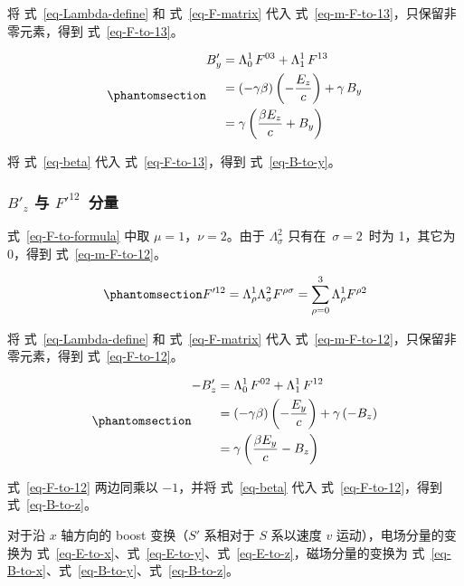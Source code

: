 \documentclass[
  chinese,
  a4paper,
  UTF8,
  12pt,
  oneside,
  openany]{ctexbook}
\theoremstyle{plain}
\theoremstyle{plain}
\theoremstyle{plain}
\theoremstyle{definition}
\theoremstyle{plain}
\theoremstyle{plain}
\theoremstyle{remark}
\begin{document}
将 式~\ref{eq-Lambda-define} 和 式~\ref{eq-F-matrix} 代入
式~\ref{eq-m-F-to-13}，只保留非零元素，得到 式~\ref{eq-F-to-13}。

\begin{equation}\protect\phantomsection\label{eq-F-to-13}{
\begin{aligned}
B'_y
&= \Lambda_{0}^{1}\,F^{03} + \Lambda_{1}^{1}\,F^{13} \\
&= (-\gamma\beta)\left(-\frac{E_z}{c}\right) + \gamma\, B_y \\
&= \gamma\left(\frac{\beta E_z}{c} + B_y \right)
\end{aligned}
}\end{equation}

将 式~\ref{eq-beta} 代入 式~\ref{eq-F-to-13}，得到 式~\ref{eq-B-to-y}。

\subsubsection{\texorpdfstring{\(B'_z\) 与
\(F'^{12}\)~分量}{B\textquotesingle\_z 与 F\textquotesingle\^{}\{12\}~分量}}\label{b_z-ux4e0e-f12-ux5206ux91cf}

式~\ref{eq-F-to-formula} 中取 \(\mu = 1\)，\(\nu = 2\)。由于
\(\Lambda_{\sigma}^{2}\) 只有在~\(\sigma = 2\)~时为 1，其它为 0，得到
式~\ref{eq-m-F-to-12}。

\begin{equation}\protect\phantomsection\label{eq-m-F-to-12}{
F'^{12} = \Lambda_{\rho}^{1}\Lambda_{\sigma}^{2}F^{\rho\sigma}
= \sum_{\rho = 0}^{3}\Lambda_{\rho}^{1}F^{\rho 2}
}\end{equation}

将 式~\ref{eq-Lambda-define} 和 式~\ref{eq-F-matrix} 代入
式~\ref{eq-m-F-to-12}，只保留非零元素，得到 式~\ref{eq-F-to-12}。

\begin{equation}\protect\phantomsection\label{eq-F-to-12}{
\begin{aligned}
-B'_z
&= \Lambda_{0}^{1}\,F^{02} + \Lambda_{1}^{1}\,F^{12} \\
&= (-\gamma\beta)\left(-\frac{E_y}{c}\right) + \gamma\left(-B_z\right) \\
&= \gamma\left(\frac{\beta E_y}{c} - B_z \right)
\end{aligned}
}\end{equation}

式~\ref{eq-F-to-12} 两边同乘以 \(-1\)，并将 式~\ref{eq-beta} 代入
式~\ref{eq-F-to-12}，得到 式~\ref{eq-B-to-z}。

对于沿 \(x\) 轴方向的 boost 变换（\(S'\) 系相对于 \(S\) 系以速度 \(v\)
运动），电场分量的变换为
式~\ref{eq-E-to-x}、式~\ref{eq-E-to-y}、式~\ref{eq-E-to-z}，磁场分量的变换为
式~\ref{eq-B-to-x}、式~\ref{eq-B-to-y}、式~\ref{eq-B-to-z}。
\end{document}
